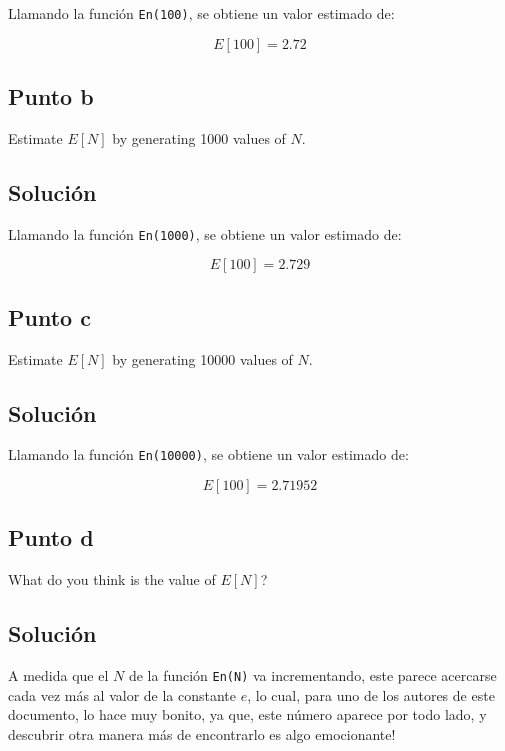 \documentclass[12pt]{article}
\begin{document}
Llamando la función \texttt{En(100)}, se obtiene un valor estimado de:


\[
 E[100] = 2.72
\]


\subsection{Punto b}

Estimate $E[N]$ by generating 1000 values of $N$.

\subsection{Solución}

Llamando la función \texttt{En(1000)}, se obtiene un valor estimado de:


\[
 E[100] = 2.729
\]





\subsection{Punto c}

Estimate $E[N]$ by generating 10000 values of $N$.

\subsection{Solución}

Llamando la función \texttt{En(10000)}, se obtiene un valor estimado de:


\[
 E[100] = 2.71952
\]



\subsection{Punto d}

What do you think is the value of $E[N]$?

\subsection{Solución}


A medida que el $N$ de la función \texttt{En(N)} va incrementando, este parece acercarse cada vez más al valor de la constante $e$, lo cual, para uno de los autores de este documento, lo hace muy bonito, ya que, este número aparece por todo lado, y descubrir otra manera más de encontrarlo es algo emocionante! 
\end{document}
